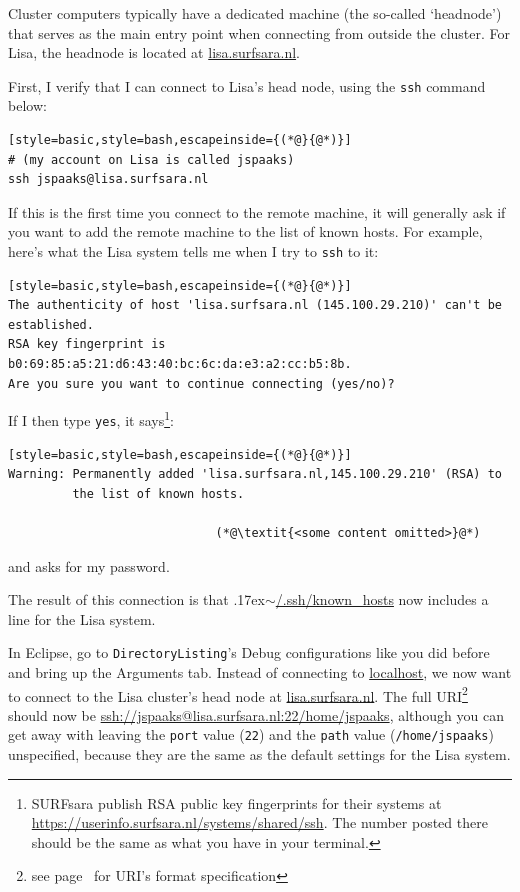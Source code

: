 \documentclass[12pt, a4paper, twoside, openany, titlepage]{book}
\newcommand{\mytilde}{\raise.17ex\hbox{$\scriptstyle\sim$}}
\begin{document}
Cluster computers typically have a dedicated machine (the so-called `headnode') that serves as the main entry point when connecting from outside the cluster. For Lisa, the headnode is located at \url{lisa.surfsara.nl}.

First, I verify that I can connect to Lisa's head node, using the \texttt{ssh} command below:
\begin{lstlisting}[style=basic,style=bash,escapeinside={(*@}{@*)}]
# (my account on Lisa is called jspaaks)
ssh jspaaks@lisa.surfsara.nl
\end{lstlisting}

If this is the first time you connect to the remote machine, it will generally ask if you want to add the remote machine to the list of known hosts. For example, here's what the Lisa system tells me when I try to \texttt{ssh} to it:
\begin{lstlisting}[style=basic,style=bash,escapeinside={(*@}{@*)}]
The authenticity of host 'lisa.surfsara.nl (145.100.29.210)' can't be
established.
RSA key fingerprint is b0:69:85:a5:21:d6:43:40:bc:6c:da:e3:a2:cc:b5:8b.
Are you sure you want to continue connecting (yes/no)?
\end{lstlisting}
If I then type \texttt{yes}, it says\footnote{SURFsara publish RSA public key fingerprints for their systems at \url{https://userinfo.surfsara.nl/systems/shared/ssh}. The number posted there should be the same as what you have in your terminal.}:
\begin{lstlisting}[style=basic,style=bash,escapeinside={(*@}{@*)}]
Warning: Permanently added 'lisa.surfsara.nl,145.100.29.210' (RSA) to
         the list of known hosts.

                             (*@\textit{<some content omitted>}@*)
\end{lstlisting}
and asks for my password.

The result of this connection is that \mytilde\url{/.ssh/known_hosts} now includes a line for the Lisa system.

In Eclipse, go to \texttt{DirectoryListing}'s \textsf{Debug configurations} like you did before and bring up the \textsf{Arguments} tab. Instead of connecting to \url{localhost}, we now want to connect to the Lisa cluster's head node at \url{lisa.surfsara.nl}. The full URI\footnote{see page~\pageref{footnote:format-uri} for URI's format specification} should now be \url{ssh://jspaaks@lisa.surfsara.nl:22/home/jspaaks}, although you can get away with leaving the \texttt{port} value (\texttt{22}) and the \texttt{path} value (\texttt{/home/jspaaks}) unspecified, because they are the same as the default settings for the Lisa system.
\end{document}

